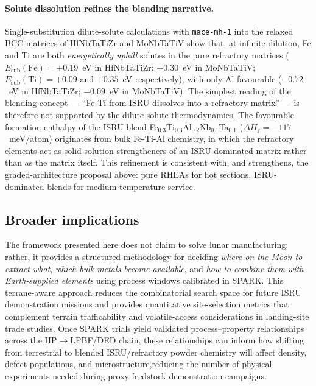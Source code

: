 \documentclass[11pt,a4paper]{article}
\begin{document}
\paragraph{Solute dissolution refines the blending narrative.}
Single-substitution dilute-solute calculations with \texttt{mace-mh-1} into the relaxed BCC matrices of HfNbTaTiZr and MoNbTaTiV show that, at infinite dilution, Fe and Ti are both \emph{energetically uphill} solutes in the pure refractory matrices ($E_{\text{sub}}(\text{Fe}) = +0.19$~eV in HfNbTaTiZr; $+0.30$~eV in MoNbTaTiV; $E_{\text{sub}}(\text{Ti}) = +0.09$ and $+0.35$~eV respectively), with only Al favourable ($-0.72$~eV in HfNbTaTiZr; $-0.09$~eV in MoNbTaTiV). The simplest reading of the blending concept --- ``Fe-Ti from ISRU dissolves into a refractory matrix'' --- is therefore not supported by the dilute-solute thermodynamics. The favourable formation enthalpy of the ISRU blend Fe$_{0.3}$Ti$_{0.3}$Al$_{0.2}$Nb$_{0.1}$Ta$_{0.1}$ ($\Delta H_f = -117$~meV/atom) originates from bulk Fe-Ti-Al chemistry, in which the refractory elements act as solid-solution strengtheners of an ISRU-dominated matrix rather than as the matrix itself. This refinement is consistent with, and strengthens, the graded-architecture proposal above: pure RHEAs for hot sections, ISRU-dominated blends for medium-temperature service.

\subsection{Broader implications}

The framework presented here does not claim to solve lunar manufacturing; rather, it provides a structured methodology for deciding \emph{where on the Moon to extract what}, \emph{which bulk metals become available}, and \emph{how to combine them with Earth-supplied elements} using process windows calibrated in SPARK. This terrane-aware approach reduces the combinatorial search space for future ISRU demonstration missions and provides quantitative site-selection metrics that complement terrain trafficability and volatile-access considerations in landing-site trade studies. Once SPARK trials yield validated process--property relationships across the HP$\rightarrow$LPBF/DED chain, these relationships can inform how shifting from terrestrial to blended ISRU/refractory powder chemistry will affect density, defect populations, and microstructure,reducing the number of physical experiments needed during proxy-feedstock demonstration campaigns.
\end{document}
